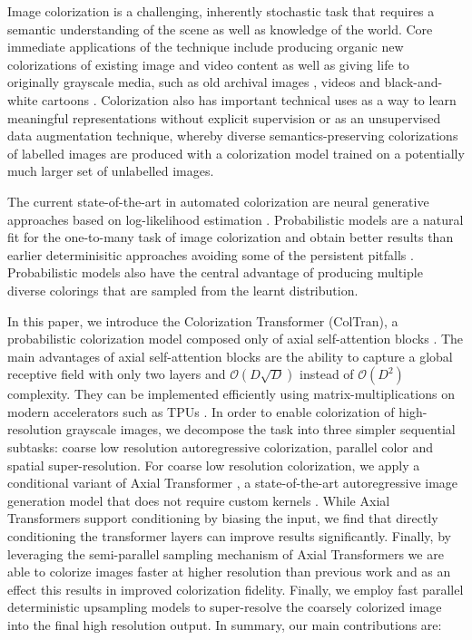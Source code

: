 \documentclass{article} \usepackage{iclr2021_conference,times}
\begin{document}
Image colorization is a challenging, inherently stochastic task that requires a semantic understanding of the scene as well as knowledge of the world.
Core immediate applications of the technique include producing organic new colorizations of existing image and video content as well as giving life to originally grayscale media, such as old archival images \citep{tsaftaris2014novel}, videos \citep{geshwind1986method} and black-and-white cartoons \citep{sykora2004unsupervised, qu2006manga, cinarel2017into}.
Colorization also has important technical uses as a way to learn meaningful representations without explicit supervision \citep{zhang2016colorful, larsson2016learning, vondrick2018tracking} or as an unsupervised data augmentation technique, whereby diverse semantics-preserving colorizations of labelled images are produced with a colorization model trained on a potentially much larger set of unlabelled images. 



The current state-of-the-art in automated colorization are neural generative approaches based on log-likelihood estimation \citep{guadarrama2017pixcolor,royer2017probabilistic,ardizzone2019guided}. Probabilistic models are a natural fit for the one-to-many task of image colorization and obtain better results than earlier determinisitic approaches avoiding some of the persistent pitfalls \citep{zhang2016colorful}. Probabilistic models also have the central advantage of producing multiple diverse colorings that are sampled from the learnt distribution. 

In this paper, we introduce the Colorization Transformer (ColTran), a probabilistic colorization model composed only of axial self-attention blocks \citep{ho2019axial, wang2020axial}. The main advantages of axial self-attention blocks are the ability to capture a global receptive field with only two layers and $\mathcal{O}(D \sqrt{D})$ instead of $\mathcal{O}(D^2)$ complexity. They can be implemented efficiently using matrix-multiplications on modern accelerators such as TPUs \citep{jouppi2017indatacenter}.
In order to enable colorization of high-resolution grayscale images, we decompose the task into three simpler sequential subtasks: coarse low resolution autoregressive colorization, parallel color and spatial super-resolution. For coarse low resolution colorization, we apply a conditional variant of Axial Transformer \citep{ho2019axial}, a state-of-the-art autoregressive image generation model that does not require custom kernels \citep{child2019generating}. While Axial Transformers support conditioning by biasing the input, we find that directly conditioning the transformer layers can improve results significantly. Finally, by leveraging the semi-parallel sampling mechanism of Axial Transformers we are able to colorize images faster at higher resolution than previous work \citep{guadarrama2017pixcolor} and as an effect this results in improved colorization fidelity. Finally, we employ fast parallel deterministic upsampling models to super-resolve the coarsely colorized image into the final high resolution output. In summary, our main contributions are:
\end{document}
